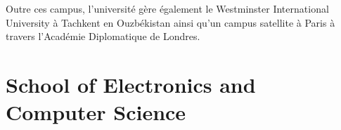 Outre ces campus, l'universit\'e g\`ere \'egalement le Westminster International University \`a Tachkent en Ouzb\'ekistan ainsi qu'un campus satellite \`a Paris \`a travers l'Acad\'emie Diplomatique de Londres.

\section{School of Electronics and Computer Science}


\clearpage
